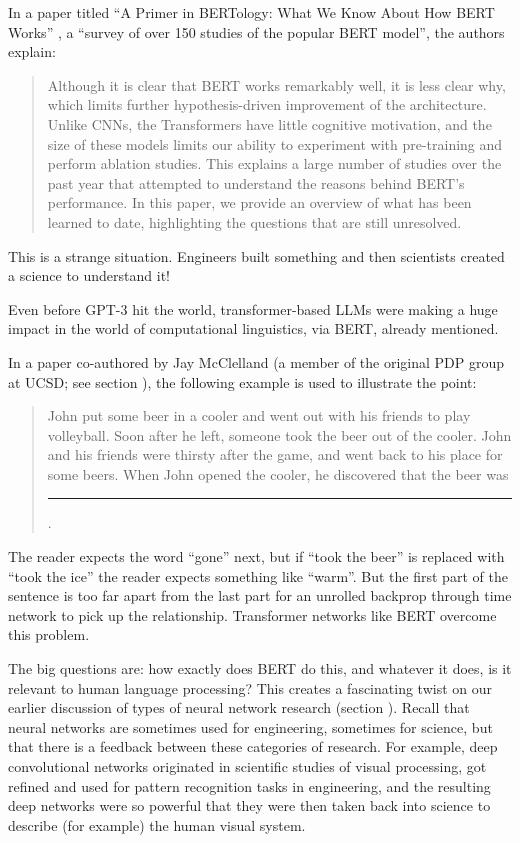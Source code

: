In a paper titled ``A Primer in BERTology: What We Know About How BERT Works'' \cite{rogers2020primer}, a ``survey of over 150 studies of the popular BERT model'',  the authors explain:
\begin{quote}
Although it is clear that BERT works remarkably well, it is less clear why, which limits further hypothesis-driven improvement of the architecture. Unlike CNNs, the Transformers have little cognitive motivation, and the size of these models limits our ability to experiment with pre-training and perform ablation studies. This explains a large number of studies over the past year that attempted to understand the reasons behind BERT’s performance. In this paper, we provide an overview of what has been learned to date, highlighting the questions that are still unresolved.
\end{quote}
This is a strange situation. Engineers built something and then scientists created a science to understand it!  

Even before GPT-3 hit the world, transformer-based LLMs were making a huge impact in the world of computational linguistics, via BERT, already mentioned. 

In a paper co-authored by Jay McClelland  \cite{mcclelland2020placing} (a member of the original PDP group at UCSD; see section ), the following example is used to illustrate the point:
\begin{quote}
John put some beer in a cooler and went out with his friends to play volleyball. Soon after he left, someone took the beer out of the cooler. John and his friends were thirsty after the game, and went back to his place for some beers. When John opened the cooler, he discovered that the beer was \rule{1cm}{0.15mm}.
\end{quote}
The reader expects the word ``gone'' next, but if ``took the beer'' is replaced with ``took the ice'' the reader expects something like ``warm''. But the first part of the sentence is too far apart from the last part for an unrolled backprop through time network to pick up the relationship.  Transformer networks like BERT overcome this problem.

The big questions are: how exactly does BERT do this, and whatever it does, is it relevant to human language processing?  This creates a fascinating twist on our earlier discussion of types of neural network research (section ). Recall that neural networks are sometimes used for engineering, sometimes for science, but that there is a feedback between these categories of research. For example, deep convolutional networks originated in scientific studies of visual processing, got refined and used for pattern recognition tasks in engineering, and the resulting deep networks were so powerful that they were then taken back into science  to describe (for example) the human visual system.

